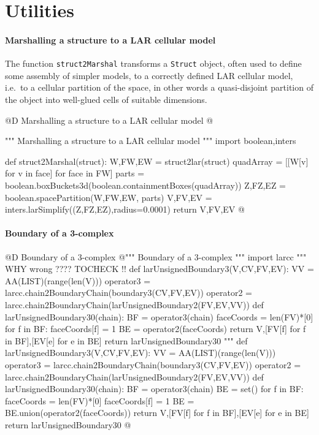 \documentclass[11pt,oneside]{article}    %
\begin{document}
\appendix
\section{Utilities}


\paragraph{Marshalling a structure to a LAR cellular model}
The function \texttt{struct2Marshal} transforms a \texttt{Struct} object, often used to 
define some assembly of simpler models, to a correctly defined LAR cellular model, i.e.~to
a cellular partition of the space, in other words a quasi-disjoint partition of the object into well-glued cells of suitable dimensions.

@D Marshalling a structure to a LAR cellular model
@{""" Marshalling a structure to a LAR cellular model """
import boolean,inters

def struct2Marshal(struct):
    W,FW,EW = struct2lar(struct)
    quadArray = [[W[v] for v in face] for face in FW]
    parts = boolean.boxBuckets3d(boolean.containmentBoxes(quadArray))
    Z,FZ,EZ = boolean.spacePartition(W,FW,EW, parts)
    V,FV,EV = inters.larSimplify((Z,FZ,EZ),radius=0.0001)
    return V,FV,EV
@}

\paragraph{Boundary of a 3-complex}
@D Boundary of a 3-complex
@{""" Boundary of a 3-complex """
import larcc
"""  WHY wrong ????  TOCHECK !!
def larUnsignedBoundary3(V,CV,FV,EV):
    VV = AA(LIST)(range(len(V)))
    operator3 = larcc.chain2BoundaryChain(boundary3(CV,FV,EV))
    operator2 = larcc.chain2BoundaryChain(larUnsignedBoundary2(FV,EV,VV))
    def larUnsignedBoundary30(chain):
        BF = operator3(chain)
        faceCoords = len(FV)*[0]
        for f in BF: faceCoords[f] = 1
        BE = operator2(faceCoords)
        return V,[FV[f] for f in BF],[EV[e] for e in BE]
    return larUnsignedBoundary30
"""
def larUnsignedBoundary3(V,CV,FV,EV):
    VV = AA(LIST)(range(len(V)))
    operator3 = larcc.chain2BoundaryChain(boundary3(CV,FV,EV))
    operator2 = larcc.chain2BoundaryChain(larUnsignedBoundary2(FV,EV,VV))
    def larUnsignedBoundary30(chain):
        BF = operator3(chain)
        BE = set()
        for f in BF: 
            faceCoords = len(FV)*[0]
            faceCoords[f] = 1
            BE = BE.union(operator2(faceCoords))
        return V,[FV[f] for f in BF],[EV[e] for e in BE]
    return larUnsignedBoundary30
@}
\end{document}
